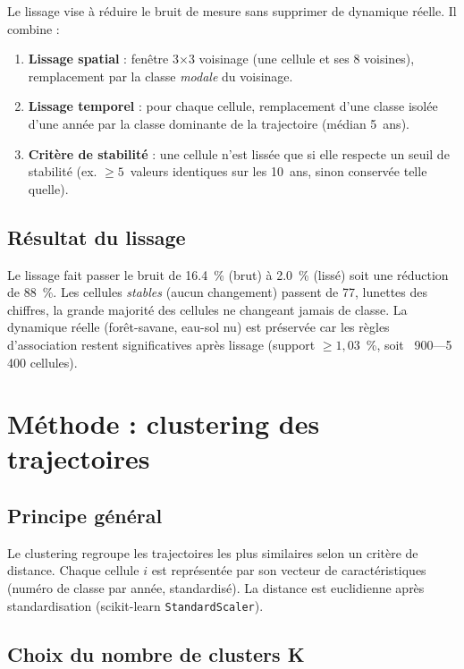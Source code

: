 Le lissage vise à réduire le bruit de mesure sans supprimer de dynamique
réelle. Il combine :
\begin{enumerate}
  \item \textbf{Lissage spatial} : fenêtre 3$\times$3 voisinage (une cellule
        et ses 8 voisines), remplacement par la classe \emph{modale} du
        voisinage.
  \item \textbf{Lissage temporel} : pour chaque cellule, remplacement
        d'une classe isolée d'une année par la classe dominante de la
        trajectoire (médian 5~ans).
  \item \textbf{Critère de stabilité} : une cellule n'est lissée que si elle
        respecte un seuil de stabilité (ex. $\ge 5$~valeurs identiques sur
        les 10~ans, sinon conservée telle quelle).
\end{enumerate}

\subsection{Résultat du lissage}

Le lissage fait passer le bruit de \SI{16,4}{\percent} (brut) à
\SI{2,0}{\percent} (lissé) soit une réduction de \SI{88}{\percent}. Les
cellules \emph{stables} (aucun changement) passent de 77, lunettes des
chiffres, la grande majorité des cellules ne changeant jamais de classe. La
dynamique réelle (forêt-savane, eau-sol nu) est préservée car les règles
d'association restent significatives après lissage (support $\geq 1,03$~\%,
soit ~900---5 400 cellules).

\section{Méthode : clustering des trajectoires}

\subsection{Principe général}

Le clustering regroupe les trajectoires les plus similaires selon un critère
de distance. Chaque cellule $i$ est représentée par son vecteur de caractéristiques
(numéro de classe par année, standardisé). La distance est euclidienne après
standardisation (scikit-learn \texttt{StandardScaler}).

\subsection{Choix du nombre de clusters K}

